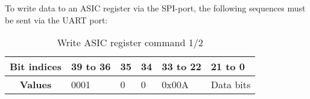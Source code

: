 To write data to an ASIC register via the SPI-port, the following sequences must be sent via the UART port:


\begin{table}[H]

\caption[]{Write ASIC register command 1/2}
    \label{tab:6}
    
  \begin{center}  
  \begin{tabular}{|c|p{2cm}|p{2cm}|p{2.5cm}|p{2cm}|p{2cm}|}
  \hline
  \textbf{Bit indices}  & 39 to 36  & 35 & 34 & 33 to 22 & 21 to 0\\ 
  \hline
  \textbf{Values} & 0001  & 0 & 0 & 0x00A & Data bits \\
  \hline
  
\end{tabular}
\end{center}
\end{table}










